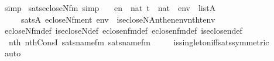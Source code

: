 \begin{isabellebody}
\ simp%
\endisatagproof
{\isafoldproof}%
%
\isadelimproof
\isanewline
%
\endisadelimproof
\isanewline
{}\isamarkupfalse%
\ sats{\isacharunderscore}{\kern0pt}ecloseN{\isacharunderscore}{\kern0pt}fm\ {\isacharbrackleft}{\kern0pt}simp{\isacharbrackright}{\kern0pt}{\isacharcolon}{\kern0pt}\isanewline
\ \ {\isachardoublequoteopen}{\isasymlbrakk}\ en\ {\isasymin}\ nat{\isacharsemicolon}{\kern0pt}\ t\ {\isasymin}\ nat\ {\isacharsemicolon}{\kern0pt}\ env\ {\isasymin}\ list{\isacharparenleft}{\kern0pt}A{\isacharparenright}{\kern0pt}\ {\isasymrbrakk}\isanewline
\ \ \ \ {\isasymLongrightarrow}\ sats{\isacharparenleft}{\kern0pt}A{\isacharcomma}{\kern0pt}\ ecloseN{\isacharunderscore}{\kern0pt}fm{\isacharparenleft}{\kern0pt}en{\isacharcomma}{\kern0pt}t{\isacharparenright}{\kern0pt}{\isacharcomma}{\kern0pt}\ env{\isacharparenright}{\kern0pt}\ {\isasymlongleftrightarrow}\ is{\isacharunderscore}{\kern0pt}ecloseN{\isacharparenleft}{\kern0pt}{\isacharhash}{\kern0pt}{\isacharhash}{\kern0pt}A{\isacharcomma}{\kern0pt}nth{\isacharparenleft}{\kern0pt}en{\isacharcomma}{\kern0pt}env{\isacharparenright}{\kern0pt}{\isacharcomma}{\kern0pt}nth{\isacharparenleft}{\kern0pt}t{\isacharcomma}{\kern0pt}env{\isacharparenright}{\kern0pt}{\isacharparenright}{\kern0pt}{\isachardoublequoteclose}\isanewline
%
\isadelimproof
\ \ %
\endisadelimproof
%
\isatagproof
{}\isamarkupfalse%
\ ecloseN{\isacharunderscore}{\kern0pt}fm{\isacharunderscore}{\kern0pt}def\ is{\isacharunderscore}{\kern0pt}ecloseN{\isacharunderscore}{\kern0pt}def\ eclose{\isacharunderscore}{\kern0pt}n{}{\isacharunderscore}{\kern0pt}fm{\isacharunderscore}{\kern0pt}def\ eclose{\isacharunderscore}{\kern0pt}n{}{\isacharunderscore}{\kern0pt}fm{\isacharunderscore}{\kern0pt}def\ is{\isacharunderscore}{\kern0pt}eclose{\isacharunderscore}{\kern0pt}n{\isacharunderscore}{\kern0pt}def\isanewline
\ \ \isamarkupfalse%
\ \ nth{\isacharunderscore}{\kern0pt}{}\ nth{\isacharunderscore}{\kern0pt}ConsI\ sats{\isacharunderscore}{\kern0pt}name{}{\isacharunderscore}{\kern0pt}fm\ sats{\isacharunderscore}{\kern0pt}name{}{\isacharunderscore}{\kern0pt}fm\ \isanewline
\ \ \ \ is{\isacharunderscore}{\kern0pt}singleton{\isacharunderscore}{\kern0pt}iff{\isacharunderscore}{\kern0pt}sats{\isacharbrackleft}{\kern0pt}symmetric{\isacharbrackright}{\kern0pt}\isanewline
\ \ \isamarkupfalse%
\ auto%
\endisatagproof
{\isafoldproof}%
%
\isadelimproof
\isanewline
%
\endisadelimproof
\isanewline
\isanewline
{}\isamarkupfalse%

\end{isabellebody}
